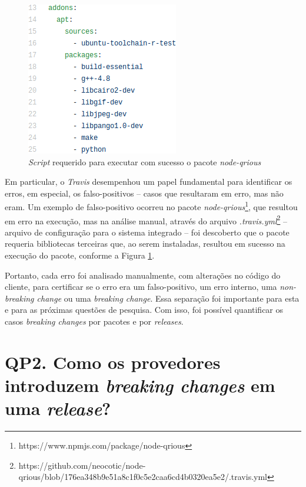 \begin{itemize}
    \begin{figure}
        \centering
        \includegraphics[scale=0.6]{figuras/false_positive.png}
        \caption{\textit{Script} requerido para executar com sucesso o pacote \textit{node-qrious}}
        \label{fig:false-positive}
    \end{figure}{}

    Em particular, o \textit{Travis} desempenhou um papel fundamental para identificar os erros, em especial, os falso-positivos -- casos que resultaram em erro, mas não eram. Um exemplo de falso-positivo ocorreu no pacote \textit{node-qrious}\footnote{https://www.npmjs.com/package/node-qrious}, que resultou em erro na execução, mas na análise manual, através do arquivo \textit{.travis.yml}\footnote{https://github.com/neocotic/node-qrious/blob/176ea348b9e51a8c1f0c5e2caa6cd4b0320ea5e2/.travis.yml} -- arquivo de configuração para o sistema integrado -- foi descoberto que o pacote requeria bibliotecas terceiras que, ao serem instaladas, resultou em sucesso na execução do pacote, conforme a Figura \ref{fig:false-positive}.
\end{itemize}{}

Portanto, cada erro foi analisado manualmente, com alterações no código do cliente, para certificar se o erro era um falso-positivo, um erro interno, uma \textit{non-breaking change} ou uma \textit{breaking change}. Essa separação foi importante para esta e para as próximas questões de pesquisa. Com isso, foi possível quantificar os casos \textit{breaking changes} por pacotes e por \textit{releases}.

\section{QP2. Como os provedores introduzem \textit{breaking changes} em uma \textit{release}?}
\label{sec:qp2}


